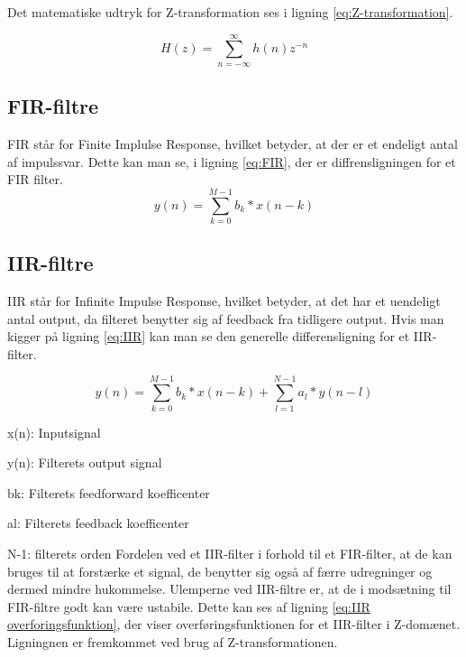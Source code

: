 Det matematiske udtryk for Z-transformation ses i ligning \ref{eq:Z-transformation}.

\begin{equation}\label{eq:Z-transformation}
{H(z)} = \displaystyle\sum_{n=-\infty }^{\infty} {h(n)z^{-n}}
\end{equation}
 
\subsection{FIR-filtre}
FIR står for Finite Implulse Response, hvilket betyder, at der er et endeligt antal af impulssvar.
Dette kan man se, i ligning \eqref{eq:FIR}, der er diffrensligningen for et FIR filter.
\begin{equation}\label{eq:FIR}
{y(n)} = \displaystyle\sum_{k=0}^{M-1} {b_{k}*x(n-k)}
\end{equation}


\subsection{IIR-filtre}
IIR står for Infinite Impulse Response, hvilket betyder, at det har et uendeligt antal output, da filteret benytter sig af feedback fra tidligere output. Hvis man kigger på ligning \eqref{eq:IIR} kan man se den generelle differensligning for et IIR-filter.


\begin{equation}\label{eq:IIR}
{y(n)} = \displaystyle\sum_{k=0}^{M-1} {b_{k}*x(n-k)}+\displaystyle\sum_{l=1}^{N-1} {a_{l}*y(n-l)}
\end{equation}

x(n): Inputsignal

y(n): Filterets output signal

b{k}: Filterets feedforward koefficenter

a{l}: Filterets feedback koefficenter

N-1: filterets orden
\newline
\newline
Fordelen ved et IIR-filter i forhold til et FIR-filter, at de kan bruges til at forstærke et signal, de benytter sig også af færre udregninger og dermed mindre hukommelse. 
Ulemperne ved IIR-filtre er, at de i modsætning til FIR-filtre godt kan være ustabile. 
Dette kan ses af ligning \eqref{eq:IIR overforingsfunktion}, der viser overføringsfunktionen for et IIR-filter i Z-domænet. Ligningnen er fremkommet ved brug af Z-transformationen.

